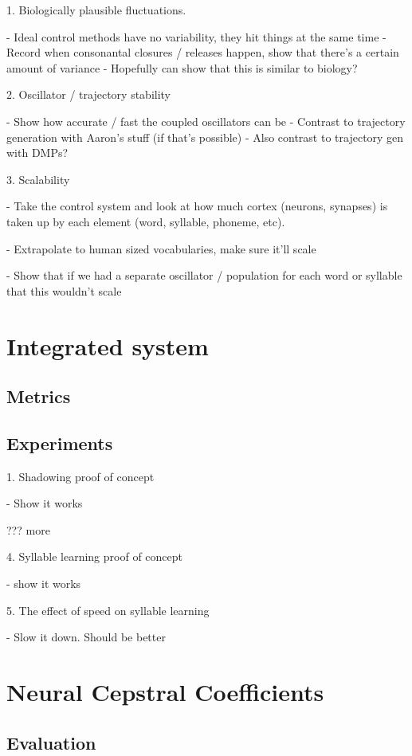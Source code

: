 1. Biologically plausible fluctuations.

- Ideal control methods have no variability, they hit things at the same time
- Record when consonantal closures / releases happen, show that there's
  a certain amount of variance
- Hopefully can show that this is similar to biology?

2. Oscillator / trajectory stability

- Show how accurate / fast the coupled oscillators can be
- Contrast to trajectory generation with Aaron's stuff
  (if that's possible)
  - Also contrast to trajectory gen with DMPs?

3. Scalability

- Take the control system and look at how much cortex (neurons, synapses)
  is taken up by each element (word, syllable, phoneme, etc).

- Extrapolate to human sized vocabularies, make sure it'll scale

- Show that if we had a separate oscillator / population
  for each word or syllable that this wouldn't scale

\section{Integrated system}

\subsection{Metrics}

\subsection{Experiments}

1. Shadowing proof of concept

- Show it works

??? more

4. Syllable learning proof of concept

- show it works

5. The effect of speed on syllable learning

- Slow it down. Should be better


\section{Neural Cepstral Coefficients}

\subsection{Evaluation}

